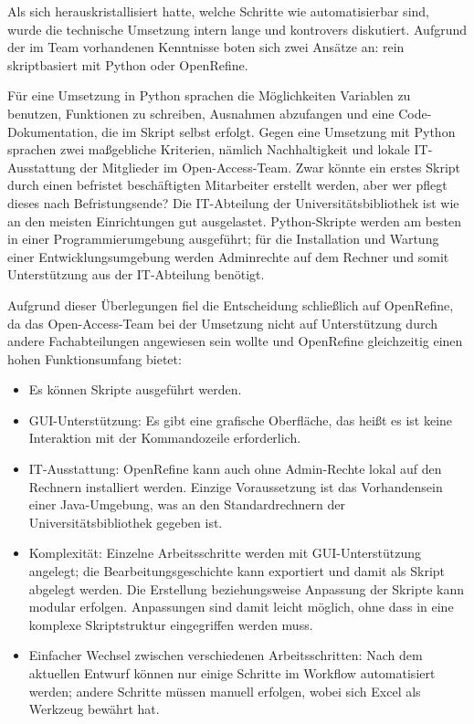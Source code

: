 \documentclass[a4paper,
fontsize=11pt,
oneside,
numbers=noperiodatend,
parskip=half-,
bibliography=totoc,
final
]{scrartcl}
\begin{document}
Als sich herauskristallisiert hatte, welche Schritte wie automatisierbar
sind, wurde die technische Umsetzung intern lange und kontrovers
diskutiert. Aufgrund der im Team vorhandenen Kenntnisse boten sich zwei
Ansätze an: rein skriptbasiert mit Python oder OpenRefine.

Für eine Umsetzung in Python sprachen die Möglichkeiten Variablen zu
benutzen, Funktionen zu schreiben, Ausnahmen abzufangen und eine
Code-Dokumentation, die im Skript selbst erfolgt. Gegen eine Umsetzung
mit Python sprachen zwei maßgebliche Kriterien, nämlich Nachhaltigkeit
und lokale IT-Ausstattung der Mitglieder im Open-Access-Team. Zwar
könnte ein erstes Skript durch einen befristet beschäftigten Mitarbeiter
erstellt werden, aber wer pflegt dieses nach Befristungsende? Die
IT-Abteilung der Universitätsbibliothek ist wie an den meisten
Einrichtungen gut ausgelastet. Python-Skripte werden am besten in einer
Programmierumgebung ausgeführt; für die Installation und Wartung einer
Entwicklungsumgebung werden Adminrechte auf dem Rechner und somit
Unterstützung aus der IT-Abteilung benötigt.

Aufgrund dieser Überlegungen fiel die Entscheidung schließlich auf
OpenRefine, da das Open-Access-Team bei der Umsetzung nicht auf
Unterstützung durch andere Fachabteilungen angewiesen sein wollte und
OpenRefine gleichzeitig einen hohen Funktionsumfang bietet:

\begin{itemize}
\item
  Es können Skripte ausgeführt werden.
\item
  GUI-Unterstützung: Es gibt eine grafische Oberfläche, das heißt es ist
  keine Interaktion mit der Kommandozeile erforderlich.
\item
  IT-Ausstattung: OpenRefine kann auch ohne Admin-Rechte lokal auf den
  Rechnern installiert werden. Einzige Voraussetzung ist das
  Vorhandensein einer Java-Umgebung, was an den Standardrechnern der
  Universitätsbibliothek gegeben ist.
\item
  Komplexität: Einzelne Arbeitsschritte werden mit GUI-Unterstützung
  angelegt; die Bearbeitungsgeschichte kann exportiert und damit als
  Skript abgelegt werden. Die Erstellung beziehungsweise Anpassung der
  Skripte kann modular erfolgen. Anpassungen sind damit leicht möglich,
  ohne dass in eine komplexe Skriptstruktur eingegriffen werden muss.
\item
  Einfacher Wechsel zwischen verschiedenen Arbeitsschritten: Nach dem
  aktuellen Entwurf können nur einige Schritte im Workflow automatisiert
  werden; andere Schritte müssen manuell erfolgen, wobei sich Excel als
  Werkzeug bewährt hat.
\end{itemize}
\end{document}
